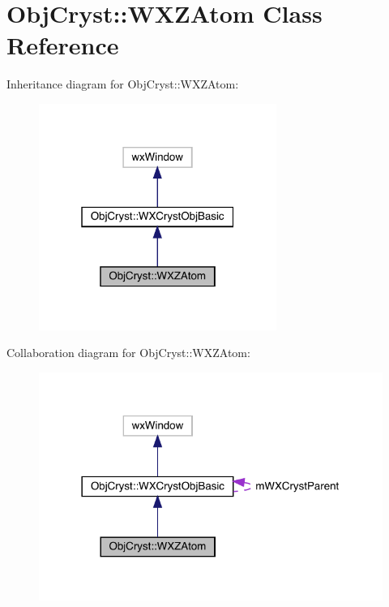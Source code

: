 \hypertarget{class_obj_cryst_1_1_w_x_z_atom}{}\section{Obj\+Cryst\+::W\+X\+Z\+Atom Class Reference}
\label{class_obj_cryst_1_1_w_x_z_atom}


Inheritance diagram for Obj\+Cryst\+::W\+X\+Z\+Atom\+:
\nopagebreak
\begin{figure}[H]
\begin{center}
\leavevmode
\includegraphics[width=220pt]{class_obj_cryst_1_1_w_x_z_atom__inherit__graph}
\end{center}
\end{figure}


Collaboration diagram for Obj\+Cryst\+::W\+X\+Z\+Atom\+:
\nopagebreak
\begin{figure}[H]
\begin{center}
\leavevmode
\includegraphics[width=318pt]{class_obj_cryst_1_1_w_x_z_atom__coll__graph}
\end{center}
\end{figure}
